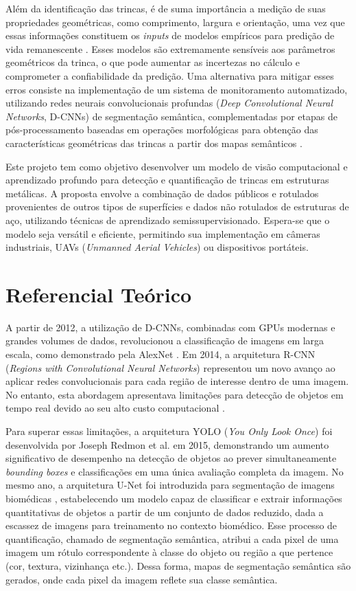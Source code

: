 \documentclass[12pt]{article}
\begin{document}
Além da identificação das trincas, é de suma importância a medição de suas propriedades geométricas, como comprimento, largura e orientação, uma vez que essas informações constituem os \textit{inputs} de modelos empíricos para predição de vida remanescente \cite{5kala2006sensitivity}. Esses modelos são extremamente sensíveis aos parâmetros geométricos da trinca, o que pode aumentar as incertezas no cálculo e comprometer a confiabilidade da predição. Uma alternativa para mitigar esses erros consiste na implementação de um sistema de monitoramento automatizado, utilizando redes neurais convolucionais profundas (\textit{Deep Convolutional Neural Networks}, D-CNNs) de segmentação semântica, complementadas por etapas de pós-processamento baseadas em operações morfológicas para obtenção das características geométricas das trincas a partir dos mapas semânticos \cite{14konig2022s}.

Este projeto tem como objetivo desenvolver um modelo de visão computacional e aprendizado profundo para detecção e quantificação de trincas em estruturas metálicas. A proposta envolve a combinação de dados públicos e rotulados provenientes de outros tipos de superfícies e dados não rotulados de estruturas de aço, utilizando técnicas de aprendizado semissupervisionado. Espera-se que o modelo seja versátil e eficiente, permitindo sua implementação em câmeras industriais, UAVs (\textit{Unmanned Aerial Vehicles}) ou dispositivos portáteis. 

\section{Referencial Teórico}

A partir de 2012, a utilização de D-CNNs, combinadas com GPUs modernas e grandes volumes de dados, revolucionou a classificação de imagens em larga escala, como demonstrado pela AlexNet \cite{8krizhevsky2017imagenet}. Em 2014, a arquitetura R-CNN (\textit{Regions with Convolutional Neural Networks}) representou um novo avanço ao aplicar redes convolucionais para cada região de interesse dentro de uma imagem. No entanto, esta abordagem apresentava limitações para detecção de objetos em tempo real devido ao seu alto custo computacional \cite{9girshick2014rich}.

Para superar essas limitações, a arquitetura YOLO (\textit{You Only Look Once}) foi desenvolvida por Joseph Redmon et al. \cite{10redmon2016you} em 2015, demonstrando um aumento significativo de desempenho na detecção de objetos ao prever simultaneamente \textit{bounding boxes} e classificações em uma única avaliação completa da imagem. No mesmo ano, a arquitetura U-Net foi introduzida para segmentação de imagens biomédicas \cite{11ronneberger2015u}, estabelecendo um modelo capaz de classificar e extrair informações quantitativas de objetos a partir de um conjunto de dados reduzido, dada a escassez de imagens para treinamento no contexto biomédico. Esse processo de quantificação, chamado de segmentação semântica, atribui a cada pixel de uma imagem um rótulo correspondente à classe do objeto ou região a que pertence (cor, textura, vizinhança etc.). Dessa forma, mapas de segmentação semântica são gerados, onde cada pixel da imagem reflete sua classe semântica. 
\end{document}
